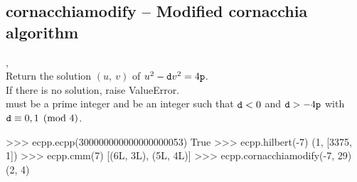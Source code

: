   \subsection{cornacchiamodify -- Modified cornacchia algorithm}
        {,\ 
        }
        {}\\
   \spacing
   \quad Return the solution $(u,\ v)$ of $u^2 - {\texttt d}v^2 = 4{\texttt p}$.\\
   \spacing
   \quad If there is no solution, raise ValueError.\\
   \spacing
   \quad  {} must be a prime integer and  be an integer such that ${\texttt d} < 0$ and ${\texttt d} > -4{\texttt p}$ with ${\texttt d} \equiv 0, 1 \pmod{4}$.\\
%
\begin{ex}
>>> ecpp.ecpp(300000000000000000053)
True
>>> ecpp.hilbert(-7)
(1, [3375, 1])
>>> ecpp.cmm(7)
[(6L, 3L), (5L, 4L)]
>>> ecpp.cornacchiamodify(-7, 29)
(2, 4)
\end{ex}%
\C



